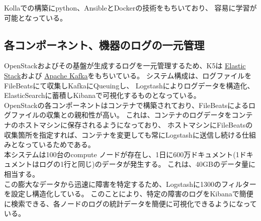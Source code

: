 Kollaでの構築にpython、AnsibleとDockerの技術をもちいており、
容易に学習が可能となっている。\\

\subsection*{各コンポーネント、機器のログの一元管理}

OpenStackおよびその基盤が生成するログを一元管理するため、K5は \href{https://www.elastic.co/jp/products}{Elastic Stack}および \href{https://kafka.apache.org/}{Apache Kafka}をもちいている。
システム構成は、ログファイルをFileBeatsにて収集しKafkaにQueuingし、
Logstashによりログデータを構造化、ElasticSearchに蓄積しKibanaで可視化するものとなっている。\\

OpenStackの各コンポーネントはコンテナで構築されており、FileBeatsによるログファイルの収集との親和性が高い。
これは、コンテナのログデータをコンテナのホストマシンに保存されるようになっており、
ホストマシンにFileBeatsの収集箇所を指定すれば、コンテナを変更しても常にLogstashに送信し続ける仕組みとなっているためである。\\

本システムは100台のcompute ノードが存在し、1日に600万ドキュメント(1ドキュメントはログの1行と同じ)のデータが発生する。
これは、40GBのデータ量に相当する。\\
この膨大なデータから迅速に障害を特定するため、Logstashに1300のフィルターを設定し構造化している。
このことにより、特定の障害のログをKibanaで簡便に検索できる、各ノードのログの統計データを簡便に可視化できるようになっている。
